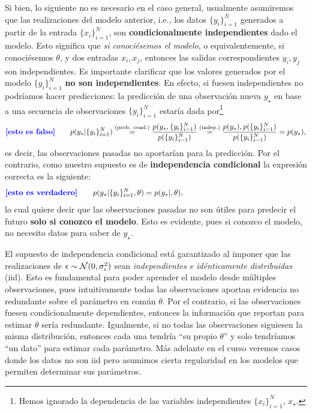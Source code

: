 Si bien, lo siguiente no es necesario en el caso general, usualmente asumiremos que las realizaciones del modelo anterior, i.e., los datos $\{y_i\}_{i=1}^N$ generados a partir de la entrada $\{x_i\}_{i=1}^N$, son \textbf{condicionalmente independientes} dado el modelo. Esto significa que \emph{si conociésemos el modelo}, o  equivalentemente, si conociésemos $\theta$, y dos entradas $x_i,x_j$, entonces las  salidas correspondientes $y_i,y_j$ son independientes. Es importante clarificar que los valores generados por el modelo $\{y_i\}_{i=1}^N$ \textbf{no son independientes}. En efecto, si fuesen independientes no podríamos hacer predicciones: la predicción de una observación nueva $y_\star$ en base a una secuencia de observaciones $\{y_i\}_{i=1}^N$ estaría dada por\footnote{Hemos ignorado la dependencia de las variables independientes $\{x_i\}_{i=1}^N$, $x_\star$.}
\begin{equation}
	\textcolor{blue}{\textbf{[esto es falso]}}\qquad p(y_\star|\{y_i\}_{i=1}^N) 
	\stackrel{\text{(prob. cond.)}}{=} \frac{p(y_\star,\{y_i\}_{i=1}^N)} {p(\{y_i\}_{i=1}^N)} 
	\stackrel{\text{(indep.)}}{=} \frac{p(y_\star),p(\{y_i\}_{i=1}^N)} {p(\{y_i\}_{i=1}^N)}
	=p(y_\star), 
\end{equation}
es decir, las observaciones pasadas no aportarían para la predicción.  Por  el contrario, como nuestro supuesto es de \textbf{independencia condicional} la expresión correcta es  la siguiente: 
\begin{equation}
	\textcolor{blue}{\textbf{[esto es verdadero]}} \qquad p(y_\star|\{y_i\}_{i=1}^N,\theta)  
	=p(y_\star|,\theta), \qquad  \qquad\qquad  \qquad \qquad  \qquad\qquad  \qquad
\end{equation}
lo cual quiere decir que las  observaciones pasadas no son útiles para predecir el  futuro \textbf{solo si conozco el modelo}. Esto es evidente, pues si conozco el modelo, no necesito datos para saber de $y_\star$. 


El supuesto de independencia condicional está garantizado al imponer que las realizaciones de $\epsilon\sim{\mathcal N}(0,\sigma_\epsilon^2)$ sean \emph{independientes e idénticamente distribuidas} (iid). Esto es  fundamental para poder aprender el modelo desde múltiples observaciones, pues intuitivamente todas las observaciones aportan evidencia no redundante sobre el parámetro en común $\theta$. Por el contrario, si las observaciones fuesen condicionalmente dependientes, entonces la información que reportan para estimar $\theta$ sería redundante. Igualmente, si no todas las observaciones siguiesen la misma distribución, entonces cada una tendría ``su propio $\theta$'' y solo tendríamos ``un  dato'' para estimar cada parámetro. Más adelante en el curso veremos casos donde los datos no son iid pero asumimos cierta regularidad en los modelos que permiten determinar sus parámetros.  

